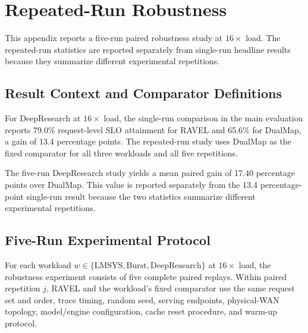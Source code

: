 \section{Repeated-Run Robustness}
\label{app:repeated-runs}

This appendix reports a five-run paired robustness study at
$16\times$ load.  The repeated-run statistics are reported separately from
single-run headline results because they summarize different experimental
repetitions.


\subsection{Result Context and Comparator Definitions}
\label{sec:appendix:result-contexts}

For DeepResearch at $16\times$ load, the single-run comparison in the main
evaluation reports 79.0\% request-level SLO attainment for \textsc{RAVEL} and
65.6\% for DualMap, a gain of 13.4 percentage points.  The repeated-run study
uses DualMap as the fixed comparator for all three workloads and all five
repetitions.

The five-run DeepResearch study yields a mean paired gain of 17.40 percentage
points over DualMap.  This value is reported separately from the 13.4
percentage-point single-run result because the two statistics summarize
different experimental repetitions.


\subsection{Five-Run Experimental Protocol}
\label{sec:appendix:repeated-run-protocol}

For each workload
$w\in\{\mathrm{LMSYS},\mathrm{Burst},\mathrm{DeepResearch}\}$ at
$16\times$ load, the robustness experiment consists of five complete paired
replays.  Within paired repetition $j$, RAVEL and the workload's fixed
comparator use the same request set and order, trace timing, random seed,
serving endpoints, physical-WAN topology, model/engine configuration, cache
reset procedure, and warm-up protocol.

